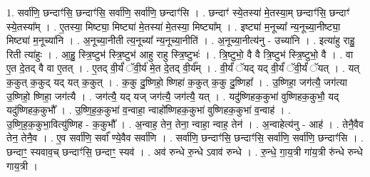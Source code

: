 \documentclass[17pt]{extarticle}
\begin{document}
1. सर्वा॑णि॒ छन्दाꣳ॑सि॒ छन्दाꣳ॑सि॒ सर्वा॑णि॒ सर्वा॑णि॒ छन्दाꣳ॑सि । . छन्दाꣳ॑ स्ये॒तस्या॑ मे॒तस्या॒म् छन्दाꣳ॑सि॒ छन्दाꣳ॑ स्ये॒तस्या᳚म् । . ए॒तस्या॒ मिष्ट्या॒ मिष्ट्या॑ मे॒तस्या॑ मे॒तस्या॒ मिष्ट्या᳚म् । . इष्ट्या॑ म॒नूच्या᳚ न्य॒नूच्या॒नीष्ट्या॒ मिष्ट्या॑ म॒नूच्या॑नि । . अ॒नूच्या॒नीती त्य॒नूच्या᳚ न्य॒नूच्या॒नीति॑ । . अ॒नूच्या॒नीत्य॑नु - उच्या॑नि । . इत्या॑हु राहु॒ रिती त्या॑हुः । . आ॒हु॒ स्त्रि॒ष्टुभ॑ स्त्रि॒ष्टुभ॑ आहु राहु स्त्रि॒ष्टुभः॑ । . त्रि॒ष्टुभो॒ वै वै त्रि॒ष्टुभ॑ स्त्रि॒ष्टुभो॒ वै । . वा ए॒त दे॒तद् वै वा ए॒तत् । . ए॒तद् वी॒र्यं॑ ॅवी॒र्य॑ मे॒त दे॒तद् वी॒र्य᳚म् । . वी॒र्यं॑ ॅयद् यद् वी॒र्यं॑ ॅवी॒र्यं॑ ॅयत् । . यत् क॒कुत् क॒कुद् यद् यत् क॒कुत् । . क॒कु दु॒ष्णिहो॒ ष्णिहा॑ क॒कुत् क॒कु दु॒ष्णिहा᳚ । . उ॒ष्णिहा॒ जग॑त्यै॒ जग॑त्या उ॒ष्णिहो॒ ष्णिहा॒ जग॑त्यै । . जग॑त्यै॒ यद् यज् जग॑त्यै॒ जग॑त्यै॒ यत् । . यदु॑ष्णिहक॒कुभा॑ वुष्णिहक॒कुभौ॒ यद् यदु॑ष्णिहक॒कुभौ᳚ । . उ॒ष्णि॒ह॒क॒कुभा॑ व॒न्वाहा॒ न्वाहो᳚ष्णिहक॒कुभा॑ वुष्णिहक॒कुभा॑ व॒न्वाह॑ । . उ॒ष्णि॒ह॒क॒कुभा॒वित्यु॑ष्णिह - क॒कुभौ᳚ । . अ॒न्वाह॒ तेन॒ तेना॒ न्वाहा॒ न्वाह॒ तेन॑ । . अ॒न्वाहेत्य॑नु - आह॑ । . तेनै॒वैव तेन॒ तेनै॒व । . ए॒व सर्वा॑णि॒ सर्वा᳚ ण्ये॒वैव सर्वा॑णि । . सर्वा॑णि॒ छन्दाꣳ॑सि॒ छन्दाꣳ॑सि॒ सर्वा॑णि॒ सर्वा॑णि॒ छन्दाꣳ॑सि । . छन्दाꣳ॒॒ स्यवाव॒च् छन्दाꣳ॑सि॒ छन्दाꣳ॒॒ स्यव॑ । . अव॑ रुन्धे रु॒न्धे ऽवाव॑ रुन्धे । . रु॒न्धे॒ गा॒य॒त्री गा॑य॒त्री रु॑न्धे रुन्धे गाय॒त्री । \newline
\end{document}
